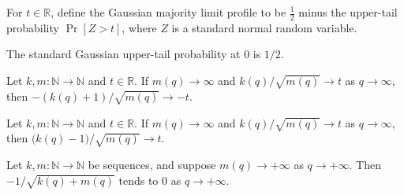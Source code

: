 \begin{definition}
\label{FABL.majorityCoalitionGaussianLimit}
\leanok
{}
For $t\in\mathbb{R}$, define the Gaussian majority limit profile to be $\frac12$ minus
the upper-tail probability $\Pr[Z>t]$, where $Z$ is a standard normal random variable.
\end{definition}

\begin{theorem}
\label{FABL.standardGaussianUpperTail_zero}
\leanok
{}
The standard Gaussian upper-tail probability at $0$ is $1/2$.
\end{theorem}

\begin{theorem}
\label{FABL.tendsto_majorityPlusBribeThreshold}
\leanok
{}
Let $k,m:\mathbb{N}\to\mathbb{N}$ and $t\in\mathbb{R}$. If $m(q)\to\infty$ and
$k(q)/\sqrt{m(q)}\to t$ as $q\to\infty$, then $-(k(q)+1)/\sqrt{m(q)}\to -t$.
\end{theorem}

\begin{theorem}
\label{FABL.tendsto_majorityMinusBribeThreshold}
\leanok
{}
Let $k,m:\mathbb{N}\to\mathbb{N}$ and $t\in\mathbb{R}$. If $m(q)\to\infty$ and
$k(q)/\sqrt{m(q)}\to t$ as $q\to\infty$, then $\bigl(k(q)-1\bigr)/\sqrt{m(q)}\to t$.
\end{theorem}

\begin{theorem}
\label{FABL.tendsto_majorityBaselineThreshold}
\leanok
{}
Let $k,m:\mathbb{N}\to\mathbb{N}$ be sequences, and suppose $m(q)\to+\infty$ as
$q\to+\infty$. Then $-1/\sqrt{k(q)+m(q)}$ tends to $0$ as $q\to+\infty$.
\end{theorem}

